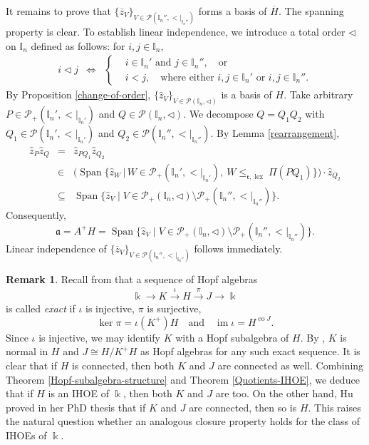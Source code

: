 \documentclass{article}
\makeatletter
\renewenvironment{proof}[1][\proofname]{\par
	\pushQED{\qed}%
	\normalfont \topsep6\p@\@plus6\p@\relax
	\trivlist
	\item[\hskip\labelsep
	\bfseries
	#1\@addpunct{.}]\ignorespaces
}{%
	\popQED\endtrivlist\@endpefalse
}
\theoremstyle{plain}
\theoremstyle{definition}
\newtheorem{remark}[thm]{Remark}
\numberwithin{equation}{section}
\DeclareMathOperator{\im}{im}
\DeclareMathOperator{\Span}{Span}
\DeclareMathOperator{\lex}{lex}
\newcommand{\PP}{\mathcal{P}}
\newcommand{\II}{\mathbb{I}}
\newcommand{\rr}{\mathfrak{r}}
\makeatother
\begin{document}
\begin{proof}
		It remains to prove that $\{\overline{z}_{V}\}_{V\in \PP(\II_{n}'',{<}|_{\II_{n}''})}$ forms a basis of $\overline{H}$. The spanning property is clear. To establish linear independence, we introduce a total order $\triangleleft$ on $\II_{n}$ defined as follows: for $i,j\in \II_{n}$,
		\begin{eqnarray*}
			i\triangleleft j
			& \Longleftrightarrow &
			\left\{
			\begin{aligned}
				& i\in \II_{n}' \text{ and } j\in \II_{n}'', \quad \text{or} \\
				& i < j, \quad \text{where either } i, j\in \II_{n}' \text{ or } i, j\in \II_{n}''.
			\end{aligned}\right .
		\end{eqnarray*}
		By Proposition \ref{change-of-order}, $\{\hat{z}_{V}\}_{V\in \PP(\II_{n}, \triangleleft)}$ is a basis of $H$. Take arbitrary $P\in \PP_{+}(\II_{n}', {<}|_{\II_{n}'})$ and  $Q\in \PP(\II_{n}, \triangleleft)$. We decompose $Q=Q_{1}Q_{2}$ with $Q_{1}\in \PP(\II_{n}',{<}|_{\II_{n}'}) $ and $Q_{2} \in \PP(\II_{n}'',{<}|_{\II_{n}''})$. By Lemma \ref{rearrangement},
		\begin{eqnarray*}
			\hat{z}_{P}\hat{z}_{Q} &=& \hat{z}_{PQ_{1}} \hat{z}_{Q_{2}} \\
			&\in & \bigl( \Span\big\{\hat{z}_{W}  \,\big|\, W \in \PP_{+}(\II_{n}', {<}|_{\II_{n}'}), ~  W\leq _{\rr,\lex} \Pi(P Q_{1}) \big\} \bigr) \cdot \hat{z}_{Q_{2}}  \\
			&\subseteq & \Span\{\hat{z}_{V} \mid V\in \PP_{+}(\II_{n}, \triangleleft) \setminus \PP_{+}(\II_{n}'', {<}|_{\II_{n}''})\}.
		\end{eqnarray*}
		Consequently,
		\[
		\mathfrak{a}=A^{+}H =\Span\{\hat{z}_{V} \mid V\in \PP_{+}(\II_{n}, \triangleleft) \setminus \PP_{+}(\II_{n}'', {<}|_{\II_{n}''})\}.
		\]
		Linear independence of $\{\overline{z}_{V}\}_{V\in \PP(\II_{n}'',{<}|_{\II_{n}''})}$ follows immediately.
	\end{proof}
	
	
	\begin{remark}\label{exact-sequence-Hopf}
		Recall from \cite{AD95} that a sequence of Hopf algebras
		\begin{eqnarray*}\label{exact-sequence}
			\Bbbk \longrightarrow K \xrightarrow{\iota} H \xrightarrow{\pi} J \longrightarrow \Bbbk
		\end{eqnarray*}
		is called \emph{exact} if $\iota$ is injective, $\pi$ is surjective,
		\[
		\ker\pi = \iota(K^{+}) H \quad \text{and} \quad \im\iota = H^{\operatorname{co}J}.
		\]
		Since $\iota$ is injective, we may identify $K$ with a Hopf subalgebra of $H$. By \cite[Proposition 1.2.3]{AD95}, $K$ is normal in $H$ and $J\cong H/K^{+}H$ as Hopf algebras for any such exact sequence. It is clear that if $H$ is connected, then both $K$ and $J$ are connected as well. Combining Theorem \ref{Hopf-subalgebra-structure} and Theorem \ref{Quotients-IHOE}, we deduce that if $H$ is an IHOE of $\Bbbk$, then both $K$ and $J$ are too. On the other hand, Hu proved in her PhD thesis \cite{Hu26} that if $K$ and $J$ are connected, then so is $H$. This raises the natural question whether an analogous closure property holds for the class of IHOEs of $\Bbbk$.
	\end{remark}
	
\end{document}
